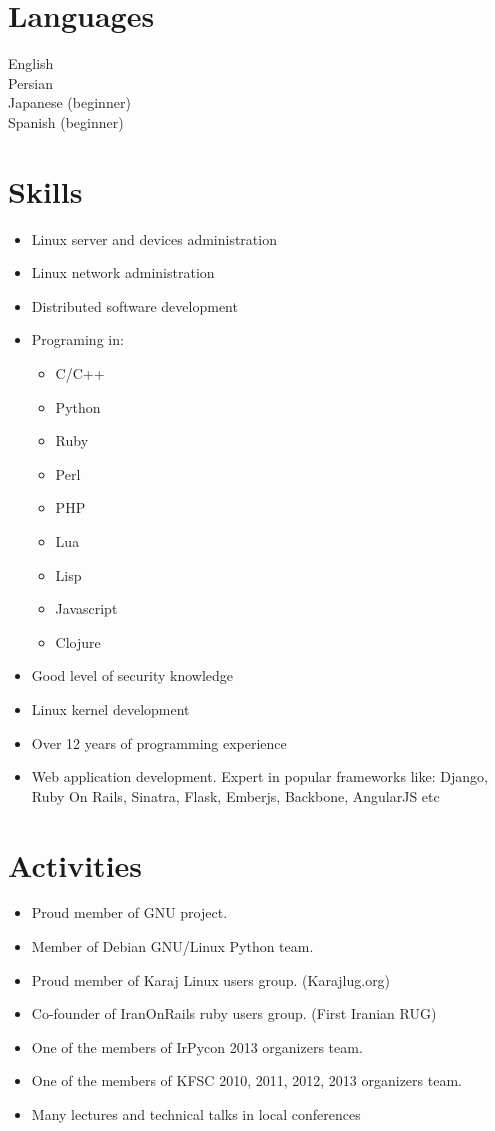 \documentclass[a4paper,11pt]{article}
\begin{document}
\section*{Languages}
English\\
Persian\\
Japanese (beginner)\\
Spanish (beginner)\\


\section*{Skills}
\begin{itemize}
\item Linux server and devices administration
\item Linux network administration
\item Distributed software development
\item Programing in:
  \begin{itemize}
  \item C/C++
  \item Python
  \item Ruby
  \item Perl
  \item PHP
  \item Lua
  \item Lisp
  \item Javascript
  \item Clojure
  \end{itemize}

\item Good level of security knowledge
\item Linux kernel development
\item Over 12 years of programming experience
\item Web application development. Expert in popular frameworks like: Django, Ruby On Rails, Sinatra, Flask, Emberjs, Backbone, AngularJS etc
\end{itemize}


\section*{Activities}
\begin{itemize}
\item Proud member of GNU project.
\item Member of Debian GNU/Linux Python team.
\item Proud member of Karaj Linux users group. (Karajlug.org)
\item Co-founder of IranOnRails ruby users group. (First Iranian RUG)
\item One of the members of IrPycon 2013 organizers team.
\item One of the members of KFSC 2010, 2011, 2012, 2013 organizers team.
\item Many lectures and technical talks in local conferences
\end{itemize}
\end{document}
